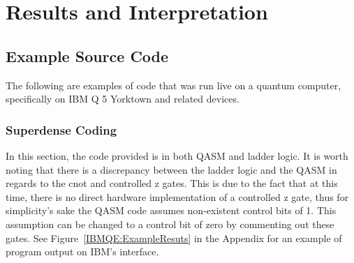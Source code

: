 \documentclass[a4paper]{article}
\begin{document}
\section{Results and Interpretation}%

\subsection{Example Source Code}
The following are examples of code that was run live on a quantum computer, specifically on IBM Q 5 Yorktown and related devices. 
\subsubsection{Superdense Coding}
In this section, the code provided is in both QASM and ladder logic.  It is worth noting that there is a discrepancy between the ladder logic and the QASM in regards to the cnot and controlled z gates.  This is due to the fact that at this time, there is no direct hardware implementation of a controlled z gate, thus for simplicity's sake the QASM code assumes non-existent control bits of 1.  This assumption can be changed to a control bit of zero by commenting out these gates. See Figure~\ref{IBMQE:ExampleResuts} in the Appendix for an example of program output on IBM's interface.

\end{document}
